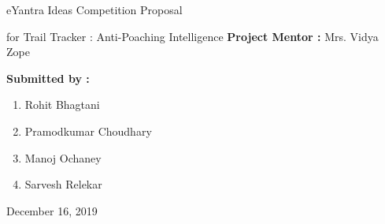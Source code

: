 \documentclass[12pt]{extarticle}
\begin{document}
	\begin{titlepage}
		\begin{center}
			\vspace*{1cm}
			
			\huge eYantra Ideas Competition Proposal
			
			\vspace{0.5cm}
			\hspace{3cm}
			\LARGE for
			\newline
			\newline
			\vspace{2cm}
			\Huge Trail Tracker : Anti-Poaching Intelligence
			\vspace{0.5cm}
			\newline
			\Large \textbf{Project Mentor :} Mrs. Vidya Zope
			
			\vspace{1cm}
			\textbf{Submitted by :}
			\begin{enumerate}
				\centering
				\item Rohit Bhagtani
				\item Pramodkumar Choudhary
				\item Manoj Ochaney
				\item Sarvesh Relekar
			\end{enumerate}
			
			\vspace{0.8cm}
			December 16, 2019
			
			
		\end{center}
	\end{titlepage}
\end{document}
